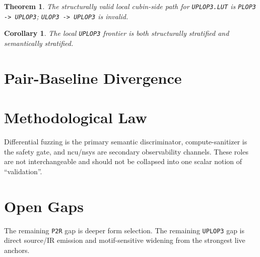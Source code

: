\documentclass[11pt]{article}
\newtheorem{theorem}{Theorem}
\newtheorem{corollary}{Corollary}
\begin{document}
\begin{theorem}
The structurally valid local cubin-side path for \texttt{UPLOP3.LUT} is
\texttt{PLOP3 -> UPLOP3}; \texttt{ULOP3 -> UPLOP3} is invalid.
\end{theorem}

\begin{corollary}
The local \texttt{UPLOP3} frontier is both structurally stratified and
semantically stratified.
\end{corollary}



\section{Pair-Baseline Divergence}


\section{Methodological Law}
Differential fuzzing is the primary semantic discriminator, compute-sanitizer
is the safety gate, and ncu/nsys are secondary observability channels. These
roles are not interchangeable and should not be collapsed into one scalar
notion of ``validation''.

\section{Open Gaps}
The remaining \texttt{P2R} gap is deeper form selection. The remaining
\texttt{UPLOP3} gap is direct source/IR emission and motif-sensitive widening
from the strongest live anchors.


\end{document}
